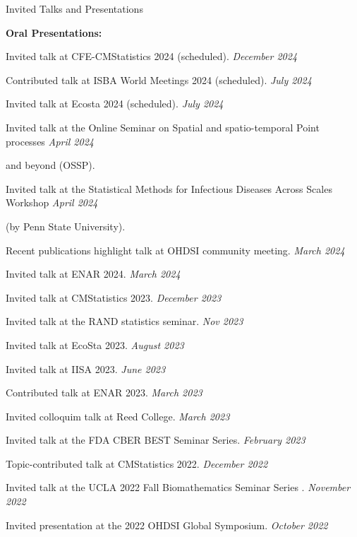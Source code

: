 \documentclass{resume} %
\begin{document}
\begin{rSection}{Invited Talks and Presentations}
	
	\hspace{-.2in} {\textbf{Oral Presentations:}}
	
	Invited talk at CFE-CMStatistics 2024 (scheduled). \hfill {\em December 2024}
	
	Contributed talk at ISBA World Meetings 2024 (scheduled).  \hfill {\em July 2024}
	
	Invited talk at Ecosta 2024 (scheduled).  \hfill {\em July 2024}
	
	Invited talk at the Online Seminar on Spatial and spatio-temporal Point processes   \hfill {\em April 2024}
	
	\vspace{-0.1in} 
	and beyond (OSSP).
	
	Invited talk at the Statistical Methods for Infectious Diseases Across Scales Workshop \hfill {\em April 2024}
	
	\vspace{-0.1in}
	(by Penn State University).
	
	Recent publications highlight talk at OHDSI community meeting. \hfill {\em March 2024}
	
	Invited talk at ENAR 2024.  \hfill {\em March 2024}
	
	Invited talk at CMStatistics 2023. \hfill {\em December 2023}
	
	Invited talk at the RAND statistics seminar. \hfill {\em Nov 2023}
	
	Invited talk at EcoSta 2023. \hfill {\em August 2023}
	
	Invited talk at IISA 2023.  \hfill {\em June 2023}
	
	
	Contributed talk at ENAR 2023. \hfill {\em March 2023}
	
	Invited colloquim talk at Reed College. \hfill {\em March 2023}
	
	Invited talk at the FDA CBER BEST Seminar Series. \hfill {\em February 2023}
	
	Topic-contributed talk at CMStatistics 2022. \hfill {\em December 2022}
	
	Invited talk at the UCLA 2022 Fall Biomathematics Seminar Series . \hfill {\em November 2022}
	
	Invited presentation at the 2022 OHDSI Global Symposium.  \hfill {\em October 2022}
	

\end{rSection}
\end{document}
